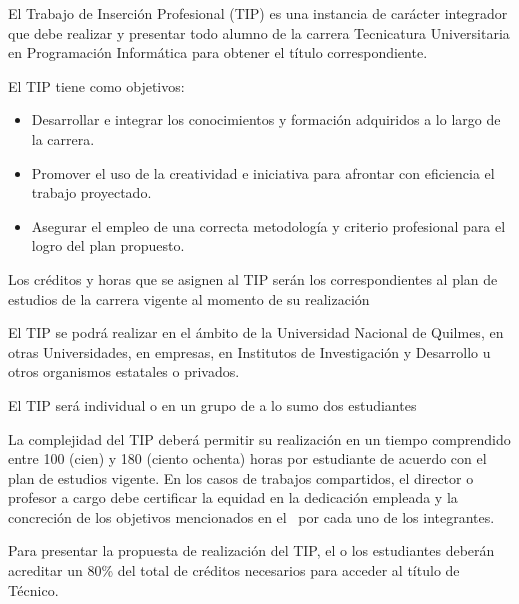 


\articulo El Trabajo de Inserción Profesional (TIP) es una instancia de
carácter integrador que debe realizar y presentar todo alumno de la carrera
Tecnicatura Universitaria en Programación Informática para obtener el título
correspondiente.

\articulo El TIP tiene como objetivos:
\begin{itemize}
 \item Desarrollar e integrar los conocimientos y formación adquiridos a lo
 largo de la carrera.
 \item Promover el uso de la creatividad e iniciativa para afrontar con
 eficiencia el trabajo proyectado.
 \item Asegurar el empleo de una correcta metodología y criterio
 profesional para el logro del plan propuesto.
\end{itemize}

\articulo Los créditos y horas que se asignen al TIP serán los
correspondientes al plan de estudios de la carrera vigente al momento de su
realización


\articulo El TIP se podrá realizar en el ámbito de la Universidad Nacional de
Quilmes, en otras Universidades, en empresas, en Institutos de Investigación y
Desarrollo u otros organismos estatales o privados. 

\articulo El TIP será individual o en un grupo de a lo sumo dos estudiantes

\articulo La complejidad del TIP deberá permitir su realización en un
tiempo comprendido entre 100 (cien) y 180 (ciento ochenta) horas por estudiante de
acuerdo con el plan de estudios vigente. En los casos de trabajos compartidos, el
director o profesor a cargo debe certificar la equidad en la dedicación empleada
y la concreción de los objetivos mencionados en el \artObjetivos\ por cada uno de los
integrantes. 

\articulo Para presentar la propuesta de realización del TIP, el o
los estudiantes deberán acreditar un 80\% del total de créditos necesarios para
acceder al título de Técnico. 

